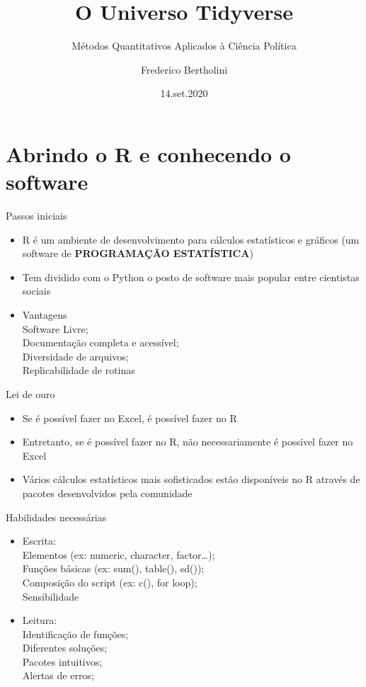 \documentclass[
  10pt,
  ignorenonframetext,
]{beamer}
\title{O Universo Tidyverse}
\subtitle{Métodos Quantitativos Aplicados à Ciência Política}
\author{Frederico Bertholini}
\date{14.set.2020}
\providecommand{\tightlist}{%
  \setlength{\itemsep}{0pt}\setlength{\parskip}{0pt}}
\begin{document}
\frame{\titlepage}

\begin{frame}[allowframebreaks]
  \tableofcontents[hideallsubsections]
\end{frame}
\hypertarget{abrindo-o-r-e-conhecendo-o-software}{%
\section{Abrindo o R e conhecendo o
software}\label{abrindo-o-r-e-conhecendo-o-software}}

\begin{frame}{Passos iniciais}
\protect\hypertarget{passos-iniciais}{}
\begin{itemize}
\tightlist
\item
  R é um ambiente de desenvolvimento para cálculos estatísticos e
  gráficos (um software de \textbf{PROGRAMAÇÃO ESTATÍSTICA})
\item
  Tem dividido com o Python o posto de software mais popular entre
  cientistas sociais\\
\item
  Vantagens\\
  Software Livre;\\
  Documentação completa e acessível;\\
  Diversidade de arquivos;\\
  Replicabilidade de rotinas
\end{itemize}
\end{frame}

\begin{frame}{Lei de ouro}
\protect\hypertarget{lei-de-ouro}{}
\begin{itemize}
\tightlist
\item
  Se é possível fazer no Excel, é possível fazer no R
\item
  Entretanto, se é possível fazer no R, não necessariamente é possível
  fazer no Excel
\item
  Vários cálculos estatísticos mais sofisticados estão disponíveis no R
  através de pacotes desenvolvidos pela comunidade
\end{itemize}
\end{frame}

\begin{frame}{Habilidades necessárias}
\protect\hypertarget{habilidades-necessuxe1rias}{}
\begin{itemize}
\tightlist
\item
  Escrita:\\
  Elementos (ex: numeric, character, factor\ldots);\\
  Funções básicas (ex: sum(), table(), sd());\\
  Composição do script (ex: c(), for loop);\\
  Sensibilidade
\item
  Leitura:\\
  Identificação de funções;\\
  Diferentes soluções;\\
  Pacotes intuitivos;\\
  Alertas de erros;
\end{itemize}
\end{frame}
\end{document}
